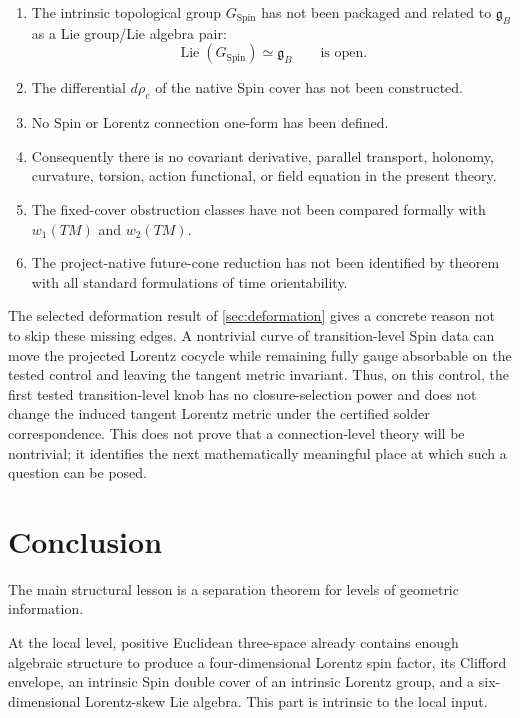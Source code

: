 \documentclass[11pt,a4paper]{article}
\theoremstyle{definition}
\theoremstyle{remark}
\newcommand{\SpinG}{G_{\mathrm{Spin}}}
\newcommand{\gB}{\mathfrak{g}_{B}}
\begin{document}
\begin{enumerate}
\item The intrinsic topological group \(\SpinG\) has not been packaged and
      related to \(\gB\) as a Lie group/Lie algebra pair:
\[
   \operatorname{Lie}(\SpinG)\simeq\gB
   \qquad\text{is open.}
\tag{12.1}
\]
\item The differential \(d\rho_e\) of the native Spin cover has not been
      constructed.
\item No Spin or Lorentz connection one-form has been defined.
\item Consequently there is no covariant derivative, parallel transport,
      holonomy, curvature, torsion, action functional, or field equation in
      the present theory.
\item The fixed-cover obstruction classes have not been compared
      formally with \(w_1(TM)\) and \(w_2(TM)\).
\item The project-native future-cone reduction has not been identified by
      theorem with all standard formulations of time orientability.
\end{enumerate}

The selected deformation result of \cref{sec:deformation} gives a concrete
reason not to skip these missing edges.  A nontrivial curve of
transition-level Spin data can move the projected Lorentz cocycle while
remaining fully gauge absorbable on the tested control and leaving the
tangent metric invariant.  Thus, on this control, the first tested transition-level knob has no
closure-selection power and does not change the induced tangent Lorentz
metric under the certified solder correspondence.  This does not prove that a
connection-level theory will be nontrivial; it identifies the next
mathematically meaningful place at which such a question can be posed.

\clearpage
\section{Conclusion}

The main structural lesson is a separation theorem for levels of geometric
information.

At the local level, positive Euclidean three-space already contains enough
algebraic structure to produce a four-dimensional Lorentz spin factor, its
Clifford envelope, an intrinsic Spin double cover of an intrinsic Lorentz
group, and a six-dimensional Lorentz-skew Lie algebra.  This part is
intrinsic to the local input.
\end{document}
